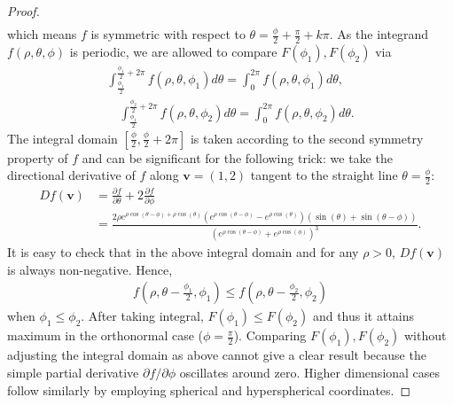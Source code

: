 \begin{proof}
\begin{equation}
\begin{aligned}
	\end{aligned}
    \end{equation}
	which means $f$ is symmetric with respect to $\theta = \frac{\phi}{2} + \frac{\pi}{2} + k\pi$. As the integrand $f(\rho,\theta,\phi)$ is periodic, we are allowed to compare $F(\phi_1), F(\phi_2)$ via 
	\begin{equation}
	\begin{aligned}
		\int_{\frac{\phi_1}{2}}^{\frac{\phi_1}{2} + 2\pi} f(\rho,\theta,\phi_1) d\theta = \int_0^{2\pi} f(\rho,\theta,\phi_1) d\theta ,\\ \quad \int_{\frac{\phi_1}{2}}^{\frac{\phi_2}{2} + 2\pi} f(\rho,\theta,\phi_2) d\theta = \int_0^{2\pi} f(\rho,\theta,\phi_2) d\theta.
	\end{aligned}
    \end{equation}
	The integral domain $[\frac{\phi}{2}, \frac{\phi}{2} + 2\pi]$ is taken according to the second symmetry property of $f$ and can be significant for the following trick: we take the directional derivative of $f$ along $\bm v = (1,2)$ tangent to the straight line $\theta = \frac{\phi}{2}$:
	\begin{equation}
	\begin{aligned}
		Df(\bm v) &= \frac{\partial f}{\partial \theta} + 2\frac{\partial f}{\partial \phi} \\&= \frac{2\rho e^{\rho\cos(\theta-\phi) + \rho\cos(\theta)}  (e^{\rho\cos(\theta-\phi)}-e^{\rho\cos(\theta)}) (\sin(\theta) + \sin(\theta-\phi)) }{(e^{\rho\cos(\theta-\phi)} + e^{\rho\cos(\phi)})^3}.
	\end{aligned}
    \end{equation}
	It is easy to check that in the above integral domain and for any $\rho > 0$, $Df(\bm v)$ is always non-negative. Hence, 
	\begin{align}
		f(\rho,\theta -\frac{\phi_1}{2},\phi_1) \leq f(\rho,\theta - \frac{\phi_2}{2},\phi_2) 
	\end{align}
	when $\phi_1 \leq \phi_2$. After taking integral, $F(\phi_1) \leq F(\phi_2)$ and thus it attains maximum in the orthonormal case ($\phi = \frac{\pi}{2}$). Comparing $F(\phi_1), F(\phi_2)$ without adjusting the integral domain as above cannot give a clear result because the simple partial derivative $\partial f/\partial \phi$ oscillates around zero. Higher dimensional cases follow similarly by employing spherical and hyperspherical coordinates.   
\end{proof}	


